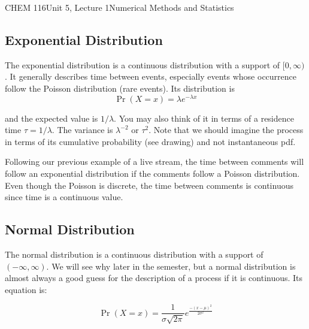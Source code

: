 \documentclass{article}
\begin{document}
\begin{tdoc}{CHEM 116}{Unit 5, Lecture 1}{Numerical Methods and Statistics}
\subsection{Exponential Distribution}
The exponential distribution is a continuous distribution with a
support of $[0,\infty)$. It generally describes time between events,
  especially events whose occurrence follow the Poisson distribution
  (rare events). Its distribution is
\begin{equation}
\Pr(X = x) = \lambda e^{-\lambda x}
\end{equation}

and the expected value is $ 1 / \lambda$. You may also think of it in
terms of a residence time $\tau = 1 / \lambda$. The variance is
$\lambda^{-2}$ or $\tau^2$. Note that we should imagine the process in
terms of its cumulative probability (see drawing) and not
instantaneous pdf.

Following our previous example of a live stream, the time between
comments will follow an exponential distribution if the comments
follow a Poisson distribution. Even though the Poisson is discrete,
the time between comments is continuous since time is a continuous
value.


\subsection{Normal Distribution}

The normal distribution is a continuous distribution with a support
of $(-\infty, \infty)$. We will see why later in the semester, but a
normal distribution is almost always a good guess for the
description of a process if it is continuous. Its equation is:

\begin{equation}
  \Pr(X = x) = \frac{1}{\sigma\sqrt{2\pi}}e^{\frac{-(x - \mu)^2}{2\sigma ^2}}
\end{equation}

\end{tdoc}
\end{document}
